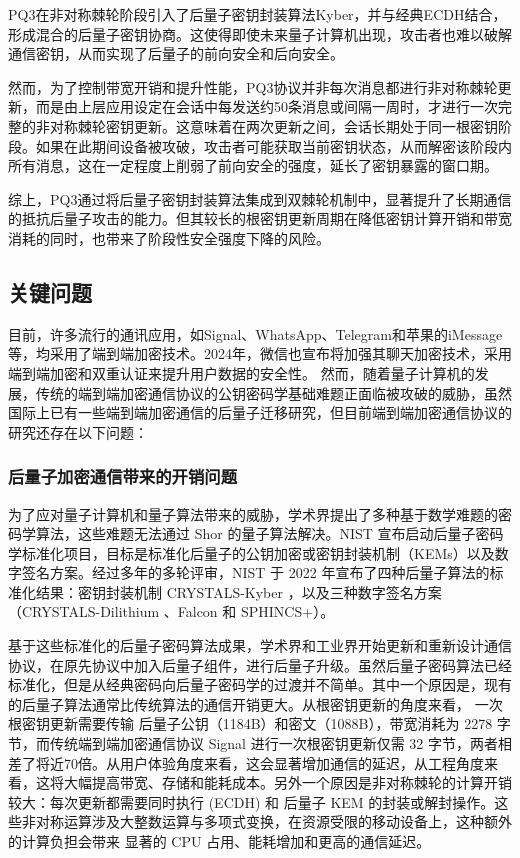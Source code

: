 PQ3在非对称棘轮阶段引入了后量子密钥封装算法Kyber\cite{bos2018crystals}，并与经典ECDH结合，形成混合的后量子密钥协商。这使得即使未来量子计算机出现，攻击者也难以破解通信密钥，从而实现了后量子的前向安全和后向安全。

然而，为了控制带宽开销和提升性能，PQ3协议并非每次消息都进行非对称棘轮更新，而是由上层应用设定在会话中每发送约50条消息或间隔一周时，才进行一次完整的非对称棘轮密钥更新。这意味着在两次更新之间，会话长期处于同一根密钥阶段。如果在此期间设备被攻破，攻击者可能获取当前密钥状态，从而解密该阶段内所有消息，这在一定程度上削弱了前向安全的强度，延长了密钥暴露的窗口期。


综上，PQ3通过将后量子密钥封装算法集成到双棘轮机制中，显著提升了长期通信的抵抗后量子攻击的能力。但其较长的根密钥更新周期在降低密钥计算开销和带宽消耗的同时，也带来了阶段性安全强度下降的风险。

\subsection{关键问题}
目前，许多流行的通讯应用，如Signal、WhatsApp、Telegram和苹果的iMessage等，均采用了端到端加密技术。2024年，微信也宣布将加强其聊天加密技术，采用端到端加密和双重认证来提升用户数据的安全性。
然而，随着量子计算机的发展，传统的端到端加密通信协议的公钥密码学基础难题正面临被攻破的威胁，虽然国际上已有一些端到端加密通信的后量子迁移研究，但目前端到端加密通信协议的研究还存在以下问题：


\subsubsection{后量子加密通信带来的开销问题}

为了应对量子计算机和量子算法带来的威胁，学术界提出了多种基于数学难题的密码学算法，这些难题无法通过 Shor 的量子算法解决。NIST 宣布启动后量子密码学标准化项目，目标是标准化后量子的公钥加密或密钥封装机制（KEMs）以及数字签名方案。经过多年的多轮评审，NIST 于 2022 年宣布了四种后量子算法的标准化结果：密钥封装机制 CRYSTALS-Kyber\cite{bos2018crystals} ，以及三种数字签名方案（CRYSTALS-Dilithium \cite{lyubashevsky2020crystals}、Falcon\cite{prest2020falcon}  和 SPHINCS+\cite{bernstein2019sphincs+}）。


基于这些标准化的后量子密码算法成果，学术界和工业界开始更新和重新设计通信协议，在原先协议中加入后量子组件，进行后量子升级。虽然后量子密码算法已经标准化，但是从经典密码向后量子密码学的过渡并不简单。其中一个原因是，现有的后量子算法通常比传统算法的通信开销更大。从根密钥更新的角度来看， 一次根密钥更新需要传输 后量子公钥（1184B）和密文（1088B），带宽消耗为 2278 字节，而传统端到端加密通信协议 Signal 进行一次根密钥更新仅需 32 字节，两者相差了将近70倍。从用户体验角度来看，这会显著增加通信的延迟，从工程角度来看，这将大幅提高带宽、存储和能耗成本。另外一个原因是非对称棘轮的计算开销较大：每次更新都需要同时执行  (ECDH) 和 后量子 KEM 的封装或解封操作。这些非对称运算涉及大整数运算与多项式变换，在资源受限的移动设备上，这种额外的计算负担会带来 显著的 CPU 占用、能耗增加和更高的通信延迟。

